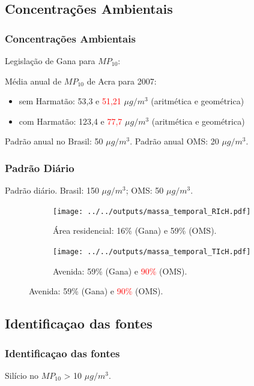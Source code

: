 \subsection{Concentrações Ambientais}
\begin{frame}
  \frametitle{Concentrações Ambientais}
 
  
  Legislação de Gana para $MP_{10}$:
  \begin{table}[H]
  \centering
  \tiny 
    
  \end{table}
%    
Média anual de $MP_{10}$ de Acra para 2007:
\begin{itemize}
	\item sem Harmatão: 53,3 e \textcolor{red}{51,21} $\mu g /m^3$ (aritmética e geométrica)	
	\item com Harmatão: 123,4 e \textcolor{red}{77,7} $\mu g /m^3$ (aritmética e geométrica)
\end{itemize}

Padrão anual no Brasil: 50 $\mu g/m^3$. Padrão anual OMS: 20 $\mu g/m^3$.
%    
\end{frame}

\begin{frame}
  \frametitle{Padrão Diário}
    Padrão diário. Brasil: 150 $\mu g/m^3$; OMS: 50 $\mu g/m^3$.
  \begin{figure}[H]
    \centering
    \begin{subfigure}[b]{0.45\textwidth}
      \texttt{[image: ../../outputs/massa\_temporal\_RIcH.pdf]}
      \caption{Área residencial: 16\% (Gana) e 59\% (OMS).}
    \end{subfigure}%
    \begin{subfigure}[b]{0.45\textwidth}
      \texttt{[image: ../../outputs/massa\_temporal\_TIcH.pdf]}
      \caption{Avenida: 59\% (Gana) e \textcolor{red}{90\%} (OMS).}
    \end{subfigure}
  \end{figure}
\end{frame}

\subsection{Identificaçao das fontes}
\begin{frame}
  \frametitle{Identificaçao das fontes}
  
\begin{tcolorbox}[colback=blue!5,colframe=blue!40!black,title=Harmatão]
  Silício no $MP_{10}$ > 10 $\mu g/m^3$.
\end{tcolorbox}
\end{frame}

